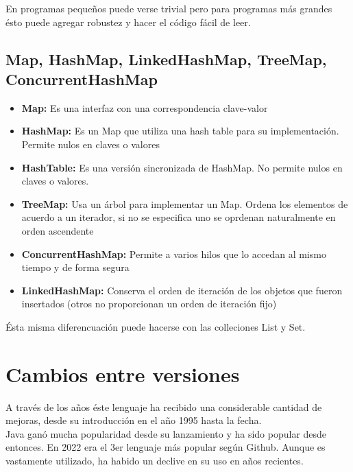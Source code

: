 \documentclass[12pt,article,oneside]{memoir}
\begin{document}
		En programas peque\~nos puede verse trivial pero para programas m\'as grandes \'esto puede agregar robustez y hacer 
		el c\'odigo f\'acil de leer.
		
		\section{Map, HashMap, LinkedHashMap, TreeMap, ConcurrentHashMap}
		
			\begin{itemize}
				\item \textbf{Map:} Es una interfaz con una correspondencia clave-valor

				\item \textbf{HashMap:} Es un Map que utiliza una hash table para su implementación. Permite nulos en claves 
				o valores
				
				\item \textbf{HashTable:} Es una versión sincronizada de HashMap. No permite nulos en claves o valores.
				
				\item \textbf{TreeMap:} Usa un árbol para implementar un Map. Ordena los elementos de acuerdo a un iterador, 
				si no se especifica uno se oprdenan naturalmente en orden ascendente
				
				\item \textbf{ConcurrentHashMap:} Permite a varios hilos que lo accedan al mismo tiempo y de forma segura
				
				\item \textbf{LinkedHashMap:} Conserva el orden de iteración de los objetos que fueron insertados (otros no 
				proporcionan un orden de iteración fijo)
			\end{itemize}
			
			\'Esta misma diferencuaci\'on puede hacerse con las colleciones List y Set. 
		
	\chapter{Cambios entre versiones}
	A trav\'es de los a\~nos \'este lenguaje ha recibido una considerable cantidad de mejoras, desde su introducci\'on en 
	el a\~no 1995 hasta la fecha.\\
	
	Java gan\'o mucha popularidad desde su lanzamiento y ha sido popular desde entonces. En 2022 era el 3er lenguaje 
	m\'as popular seg\'un Github. Aunque es vastamente utilizado, ha habido un declive en su uso en a\~nos recientes.\\
	
\end{document}
